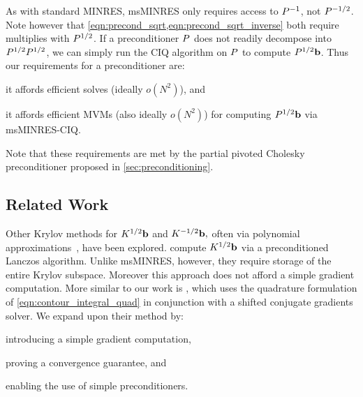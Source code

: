 As with standard MINRES, msMINRES only requires access to $P^{-1}$, not $P^{-1/2}$.
Note however that \cref{eqn:precond_sqrt,eqn:precond_sqrt_inverse} both require multiplies with $P^{1/2}$.
If a preconditioner $P$ does not readily decompose into $P^{1/2} P^{1/2}$, we can simply run the CIQ algorithm on $P$ to compute $P^{1/2} \mathbf{b}$.
Thus our requirements for a preconditioner are:
\begin{enumerate*}
	\item it affords efficient solves (ideally $o(N^2)$), and
  \item it affords efficient MVMs (also ideally $o(N^2)$) for computing $P^{1/2} \mathbf{b}$ via msMINRES-CIQ.
\end{enumerate*}
%
Note that these requirements are met by the partial pivoted Cholesky preconditioner proposed in \cref{sec:preconditioning}.






\subsection{Related Work}
Other Krylov methods for $K^{1/2} \mathbf{b}$ and $K^{-1/2} \mathbf{b},$ often via polynomial approximations~\citep[e.g.][]{higham2008functions}, have been explored.
\citet{chow2014preconditioned} compute $K^{1/2} \mathbf{b}$ via a preconditioned Lanczos algorithm.
Unlike msMINRES, however, they require storage of the entire Krylov subspace. Moreover this approach does not afford a simple gradient computation.
More similar to our work is \cite{aune2013iterative,aune2014parameter}, which uses the quadrature formulation of \cref{eqn:contour_integral_quad} in conjunction with a shifted conjugate gradients solver.
We expand upon their method by:
\begin{enumerate*}
  \item introducing a simple gradient computation,
  \item proving a convergence guarantee, and
  \item enabling the use of simple preconditioners.
\end{enumerate*}
